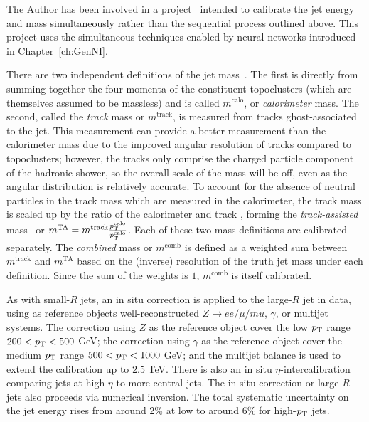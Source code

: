 The Author has been involved in a project~\cite{ATL-PHYS-PUB-2020-001} intended to calibrate the jet energy and mass simultaneously rather than the sequential process outlined above.
This project uses the simultaneous techniques enabled by neural networks introduced in Chapter~\ref{ch:GenNI}.

There are two independent definitions of the jet mass~\cite{ATLAS-CONF-2016-035}.
The first is directly from summing together the four momenta of the constituent topoclusters (which are themselves assumed to be massless) and is called $m^\text{calo}$, or \textit{calorimeter} mass.
The second, called the \textit{track} mass or $m^\text{track}$, is measured from tracks ghost-associated to the jet.
This measurement can provide a better measurement than the calorimeter mass due to the improved angular resolution of tracks compared to topoclusters; however, the tracks only comprise the charged particle component of the hadronic shower, so the overall scale of the mass will be off, even as the angular distribution is relatively accurate.
To account for the absence of neutral particles in the track mass which are measured in the calorimeter, the track mass is scaled up by the ratio of the calorimeter and track \pt{}, forming the \textit{track-assisted} mass~\cite{Elder:2018mcr} or $m^\text{TA}=m^\text{track}\frac{p_{\text{T}}^\text{calo}}{p_{\text{T}}^\text{calo}}$.
Each of these two mass definitions are calibrated separately.
The \textit{combined} mass or $m^\text{comb}$ is defined as a weighted sum between $m^\text{track}$ and $m^\text{TA}$ based on the (inverse) resolution of the truth jet mass under each definition.
Since the sum of the weights is $1$, $m^\text{comb}$ is itself calibrated.

As with small-$R$ jets, an in situ correction is applied to the large-$R$ jet \pt{} in data, using as reference objects well-reconstructed $Z \rightarrow ee/\mu/mu$, $\gamma$, or multijet systems.
The correction using $Z$ as the reference object cover the low $p_{\text{T}}$ range $200 < p_{\text{T}} < 500$ GeV; the correction using $\gamma$ as the reference object cover the medium $p_{\text{T}}$ range $500 < p_{\text{T}} < 1000$ GeV; and the multijet balance is used to extend the calibration up to $2.5$ TeV.
There is also an in situ $\eta$-intercalibration comparing jets at high $\eta$ to more central jets.
The in situ correction or large-$R$ jets also proceeds via numerical inversion.
The total systematic uncertainty on the jet energy rises from around 2\% at low \pt{} to around 6\% for high-$p_{\text{T}}$ jets.

